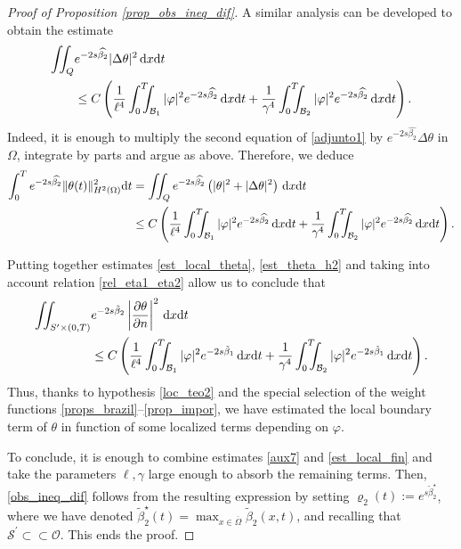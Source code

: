 \documentclass{aims}
\theoremstyle{definition}
\def\dx{\,\textnormal{d}x}
\def\dt{\textnormal{d}t}
\begin{document}
\begin{proof}[Proof of Proposition \ref{prop_obs_ineq_dif}]
A similar analysis can be developed to obtain the estimate
%
\begin{equation}\label{aux10}
\begin{split}
\iint_{Q} &e^{-2s\widehat{\beta_2}}|\Delta\theta|^2\dx\dt\\
&\leq C\left(\frac{1}{\ell^4}\int_0^T\!\!\!\!\int_{\mathcal B_1}|\varphi|^2e^{-2s\widehat{\beta_2}}\dx\dt+\frac{1}{\gamma^4}\int_0^T\!\!\!\!\int_{\mathcal B_2}|\varphi|^2e^{-2s\widehat{\beta_2}}\dx\dt\right).
\end{split}
\end{equation}
%
Indeed, it is enough to multiply the second equation of \eqref{adjunto1} by $e^{-2s\widehat{\beta_2}}\Delta\theta$ in $\Omega$, integrate by parts and argue as above. Therefore, we deduce
%
\begin{align}\notag 
\int_{0}^Te^{-2s\widehat{\beta_2}}\|\theta(t)\|_{H^2(\Omega)}^2\dt&=\iint_{Q}e^{-2s\widehat{\beta_2}}\left(|\theta|^2+
|\Delta \theta|^2\right)\dx\dt \\ \label{est_theta_h2}
&\leq C\left(\frac{1}{\ell^4}\int_0^T\!\!\!\!\int_{\mathcal B_1}|\varphi|^2e^{-2s\widehat{\beta_2}}\dx\dt+\frac{1}{\gamma^4}\int_0^T\!\!\!\!\int_{\mathcal B_2}|\varphi|^2e^{-2s\widehat{\beta_2}}\dx\dt\right).
\end{align}
%

Putting together estimates \eqref{est_local_theta}, \eqref{est_theta_h2} and taking into account relation \eqref{rel_eta1_eta2} allow us to conclude that
%
\begin{equation}\label{est_local_fin}
\begin{split}
\iint_{S^{\prime}\times(0,T)}&e^{-2s\tilde\beta_2}\left|\frac{\partial \theta}{\partial n}\right|^2\dx\dt \\
& \leq C\left(\frac{1}{\ell^4}\int_0^T\!\!\!\!\int_{\mathcal B_1}|\varphi|^2e^{-2s\tilde{\beta}_1}\dx\dt+\frac{1}{\gamma^4}\int_0^T\!\!\!\!\int_{\mathcal B_2}|\varphi|^2e^{-2s\tilde{\beta}_1}\dx\dt\right).
\end{split}
\end{equation}
%
Thus, thanks to hypothesis \eqref{loc_teo2} and the special selection of the weight functions \eqref{props_brazil}--\eqref{prop_impor}, we have estimated the local boundary term of $\theta$ in function of some localized terms depending on $\varphi$. 

To conclude, it is enough to combine estimates \eqref{aux7} and \eqref{est_local_fin} and take the parameters $\ell,\gamma$ large enough to absorb the remaining terms. Then, \eqref{obs_ineq_dif} follows from the resulting expression by setting $\varrho_2(t):=e^{s\tilde\beta_2^\star}$, where we have denoted $\tilde{\beta}_2^\star(t)=\max_{x\in\overline{\Omega}}\tilde\beta_2(x,t)$, and recalling that $\mathcal S^\prime\subset\subset \mathcal O$.  This ends the proof. 
%
\end{proof}
\end{document}
